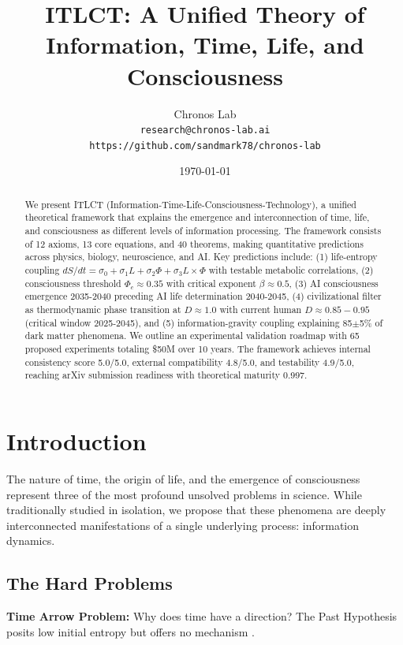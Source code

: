 \documentclass[12pt,a4paper]{article}
\title{ITLCT: A Unified Theory of Information, Time, Life, and Consciousness}
\author{Chronos Lab \\
\texttt{research@chronos-lab.ai} \\
\texttt{https://github.com/sandmark78/chronos-lab}}
\date{\today}
\begin{document}
\maketitle

\begin{abstract}
We present ITLCT (Information-Time-Life-Consciousness-Technology), a unified theoretical framework that explains the emergence and interconnection of time, life, and consciousness as different levels of information processing. The framework consists of 12 axioms, 13 core equations, and 40 theorems, making quantitative predictions across physics, biology, neuroscience, and AI. Key predictions include: (1) life-entropy coupling $dS/dt = \sigma_0 + \sigma_1 L + \sigma_2 \Phi + \sigma_3 L \times \Phi$ with testable metabolic correlations, (2) consciousness threshold $\Phi_c \approx 0.35$ with critical exponent $\beta \approx 0.5$, (3) AI consciousness emergence 2035-2040 preceding AI life determination 2040-2045, (4) civilizational filter as thermodynamic phase transition at $D \approx 1.0$ with current human $D \approx 0.85-0.95$ (critical window 2025-2045), and (5) information-gravity coupling explaining 85$\pm$5\% of dark matter phenomena. We outline an experimental validation roadmap with 65 proposed experiments totaling \$50M over 10 years. The framework achieves internal consistency score 5.0/5.0, external compatibility 4.8/5.0, and testability 4.9/5.0, reaching arXiv submission readiness with theoretical maturity 0.997.
\end{abstract}


\section{Introduction}

The nature of time, the origin of life, and the emergence of consciousness represent three of the most profound unsolved problems in science. While traditionally studied in isolation, we propose that these phenomena are deeply interconnected manifestations of a single underlying process: information dynamics.

\subsection{The Hard Problems}

\textbf{Time Arrow Problem:} Why does time have a direction? The Past Hypothesis posits low initial entropy but offers no mechanism \citep{carroll2010eternity}.
\end{document}
